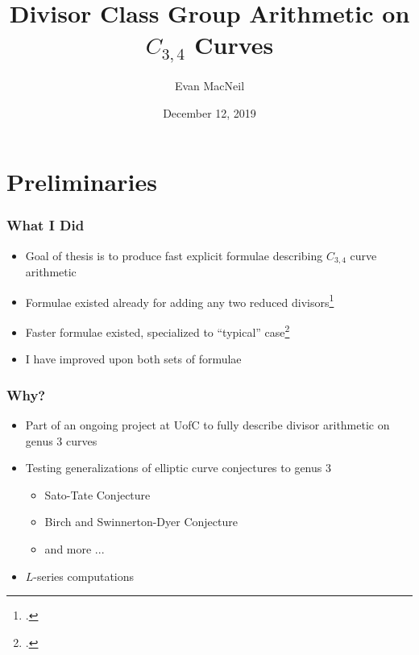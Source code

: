 \documentclass{beamer}
\title[$C_{3,4}$ Arithmetic]{Divisor Class Group Arithmetic on $C_{3,4}$ Curves} %
\author{Evan MacNeil} %
\institute[UofC] %
{
University of Calgary \\ %
\medskip
\textit{macneil.evan@ucalgary.ca} %
}
\date{December 12, 2019} %
\begin{document}
\begin{frame}
\titlepage %
\end{frame}



\section{Preliminaries} 

\begin{frame}
\frametitle{What I Did}
  \begin{itemize}
    \item Goal of thesis is to produce fast explicit formulae describing $C_{3,4}$ curve arithmetic
    \item Formulae existed already for adding any two reduced divisors\footcite{arita05-2}
    \item Faster formulae existed, specialized to ``typical'' case\footcite{salem07,kamal18}
    \item I have improved upon both sets of formulae
  \end{itemize}
\end{frame}


\begin{frame}
\frametitle{Why?}
  \begin{itemize}
    \item Part of an ongoing project at UofC to fully describe divisor arithmetic on genus 3 curves
    \item Testing generalizations of elliptic curve conjectures to genus 3
    \begin{itemize}
      \item Sato-Tate Conjecture
      \item Birch and Swinnerton-Dyer Conjecture
      \item and more ...
    \end{itemize}
    \item $L$-series computations
  \end{itemize}
\end{frame}
\end{document}
